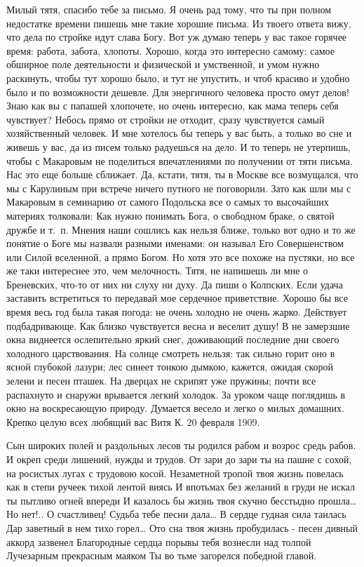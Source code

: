 Милый тятя, спасибо тебе  за письмо. Я очень рад тому, что ты при полном недостатке времени пишешь мне такие хорошие письма. Из твоего ответа вижу, что дела по стройке идут слава Богу. Вот уж думаю теперь у вас такое горячее время: работа, забота, хлопоты. Хорошо, когда это интересно самому: самое обширное поле деятельности и физической и умственной, и умом нужно раскинуть, чтобы тут хорошо было, и тут не упустить, и чтоб красиво и удобно было и по возможности дешевле. Для энергичного человека просто омут делов! Знаю как вы с папашей хлопочете, но очень интересно, как мама теперь себя чувствует? Небось прямо от стройки не отходит, сразу чувствуется самый хозяйственный человек. И мне хотелось бы теперь у вас быть, а только во сне и живешь у вас, да из писем только радуешься на дело.  И то теперь не утерпишь, чтобы с Макаровым не поделиться впечатлениями по получении от тяти письма. Нас это еще больше сближает. Да, кстати, тятя, ты в Москве все возмущался, что мы с Карулиным при встрече ничего путного не поговорили. Зато как шли мы с Макаровым в семинарию от самого Подольска все о самых то высочайших материях толковали: Как нужно понимать Бога, о свободном браке, о святой дружбе и т. п. Мнения наши сошлись как нельзя ближе, только вот одно  и то же  понятие о Боге мы назвали разными именами: он называл Его Совершенством или Силой вселенной, а прямо Богом. Но хотя это все похоже на пустяки, но все же таки интереснее это, чем мелочность. 
Тятя, не напишешь ли мне о Бреневских, что-то от них ни слуху ни духу. Да пиши о Колпских. Если удача заставить встретиться  то передавай мое сердечное приветствие. 
Хорошо бы все время весь год была такая погода: не очень холодно не очень жарко. Действует подбадривающе.  Как близко чувствуется весна и веселит душу! В не замерзшие окна виднеется ослепительно яркий снег, доживающий последние дни своего холодного царствования. На солнце смотреть нельзя: так сильно горит оно в ясной глубокой лазури; лес синеет тонкою дымкою, кажется, ожидая скорой зелени и песен пташек. На дверцах не скрипят уже  пружины; почти все распахнуто и снаружи врывается легкий холодок. За уроком чаще поглядишь в окно на воскресающую природу. Думается весело и легко о милых домашних. Крепко целую всех любящий вас Витя К. 
20 февраля 1909.

Сын широких полей и раздольных лесов ты родился рабом и возрос средь рабов. И окреп среди лишений, нужды и трудов.
От зари до зари ты на пашне с сохой, на росистых лугах с трудовою косой. 
Незаметной тропой твоя жизнь повелась как в степи ручеек тихой лентой виясь
И впотьмах без желаний в груди не искал ты пытливо огней впереди
И казалось бы жизнь твоя скучно бесстыдно прошла…
Но нет!..  О счастливец! Судьба тебе песни дала…
В сердце гудная сила таилась Дар заветный в нем тихо горел… Ото сна твоя жизнь пробудилась -  песен дивный аккорд зазвенел
Благородные сердца порывы тебя вознесли над толпой Лучезарным прекрасным маяком
Ты во тьме загорелся победной главой. 


